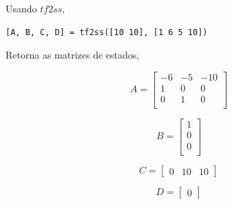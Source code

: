 \documentclass[paper=a4, fontsize=11pt]{article}
\begin{document}
\begin{list}{\textbf{Questão .}}{
\setlength{\labelwidth}{-2mm} \setlength{\parsep}{0mm}
\setlength{\topsep}{0mm} \setlength{\leftmargin}{0mm}}
            Usando $tf2ss$, 

            \begin{lstlisting}
[A, B, C, D] = tf2ss([10 10], [1 6 5 10])
            \end{lstlisting}

            Retorna as matrizes de estados,

            $$
            A = \left[\begin{array}{rrr}
                    -6 & -5 & -10 \\
                    1 & 0 & 0 \\
                    0 & 1 & 0 \\
            \end{array}\right]
            $$

            $$
            B = \left[\begin{array}{r}
                1 \\
                0 \\
                0 \\
            \end{array}\right]
            $$

            $$
            C = \left[\begin{array}{rrr}
                0 & 10 & 10
               \end{array}\right]
            $$

            $$
            D = \left[\begin{array}{r}
                0 
               \end{array}\right]
            $$



\end{list}
\end{document}
